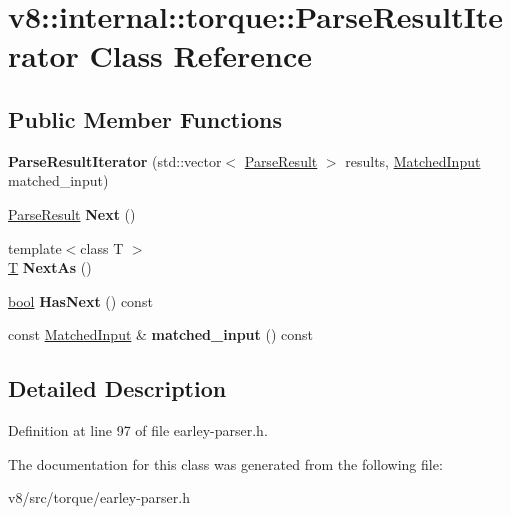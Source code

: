 \hypertarget{classv8_1_1internal_1_1torque_1_1ParseResultIterator}{}\section{v8\+:\+:internal\+:\+:torque\+:\+:Parse\+Result\+Iterator Class Reference}
\label{classv8_1_1internal_1_1torque_1_1ParseResultIterator}
\subsection*{Public Member Functions}
\begin{DoxyCompactItemize}
\item 
\mbox{\label{classv8_1_1internal_1_1torque_1_1ParseResultIterator_a626339f63ece9d57e199a7d94f6358ad}} 
{\bfseries Parse\+Result\+Iterator} (std\+::vector$<$ \mbox{\hyperlink{classv8_1_1internal_1_1torque_1_1ParseResult}{Parse\+Result}} $>$ results, \mbox{\hyperlink{structv8_1_1internal_1_1torque_1_1MatchedInput}{Matched\+Input}} matched\+\_\+input)
\item 
\mbox{\label{classv8_1_1internal_1_1torque_1_1ParseResultIterator_ab85d07f12d729d53b7a0ceb95aa5d94b}} 
\mbox{\hyperlink{classv8_1_1internal_1_1torque_1_1ParseResult}{Parse\+Result}} {\bfseries Next} ()
\item 
\mbox{\label{classv8_1_1internal_1_1torque_1_1ParseResultIterator_aa0509678e150f5eee7f210f3c96696f9}} 
{\footnotesize template$<$class T $>$ }\\\mbox{\hyperlink{classv8_1_1internal_1_1torque_1_1T}{T}} {\bfseries Next\+As} ()
\item 
\mbox{\label{classv8_1_1internal_1_1torque_1_1ParseResultIterator_ae3e459acd05363705f3c80a5b78bdc04}} 
\mbox{\hyperlink{classbool}{bool}} {\bfseries Has\+Next} () const
\item 
\mbox{\label{classv8_1_1internal_1_1torque_1_1ParseResultIterator_a4ce7396c053c947ce4bc577e9f350e69}} 
const \mbox{\hyperlink{structv8_1_1internal_1_1torque_1_1MatchedInput}{Matched\+Input}} \& {\bfseries matched\+\_\+input} () const
\end{DoxyCompactItemize}


\subsection{Detailed Description}


Definition at line 97 of file earley-\/parser.\+h.



The documentation for this class was generated from the following file\+:\begin{DoxyCompactItemize}
\item 
v8/src/torque/earley-\/parser.\+h\end{DoxyCompactItemize}
